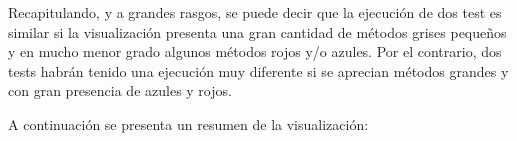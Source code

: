 \par Recapitulando, y a grandes rasgos, se puede decir que la ejecución de dos test es similar si la visualización presenta una gran cantidad de métodos grises pequeños y en mucho menor grado algunos métodos rojos y/o azules. Por el contrario, dos tests habrán tenido una ejecución muy diferente si se aprecian métodos grandes y con gran presencia de azules y rojos. 

\par A continuación se presenta un resumen de la visualización:

